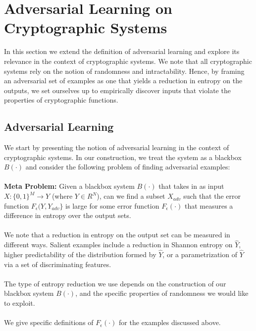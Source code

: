 \section{Adversarial Learning on Cryptographic Systems}

In this section we extend the definition of adversarial learning and explore its relevance in the context of cryptographic systems. We note that all cryptographic systems rely on the notion of randomness and intractability. Hence, by framing an adversarial set of examples as one that yields a reduction in entropy on the outputs, we set ourselves up to empirically discover inputs that violate the properties of cryptographic functions. 

\subsection{Adversarial Learning}
We start by presenting the notion of adversarial learning in the context of cryptographic systems. In our construction, we treat the system as a blackbox $B(\cdot)$ and consider the following problem of finding adversarial examples:
\\
\\
\textbf{Meta Problem:} Given a blackbox system $B(\cdot)$ that takes in as input $X: \{0,1\}^{M} \rightarrow Y$ (where $Y \in R^{N}$), can we find a subset $X_{adv}$ such that the error function $F_{\epsilon} (Y, Y_{adv} \}$ is large for some error function $F_{\epsilon}(\cdot )$ that measures a difference in entropy over the output sets.
\\
\\
We note that a reduction in entropy on the output set can be measured in different ways. Salient examples include a reduction in Shannon entropy on $\hat{Y}$, higher predictability of the distribution formed by $\hat{Y}$, or a parametrization of $\hat{Y}$ via a set of discriminating features.
\\
\\
The type of entropy reduction we use depends on the construction of our blackbox system $B(\cdot)$, and the specific properties of randomness we would like to exploit.  
\\
\\
We give specific definitions of $F_{\epsilon}(\cdot)$ for the examples discussed above. 
